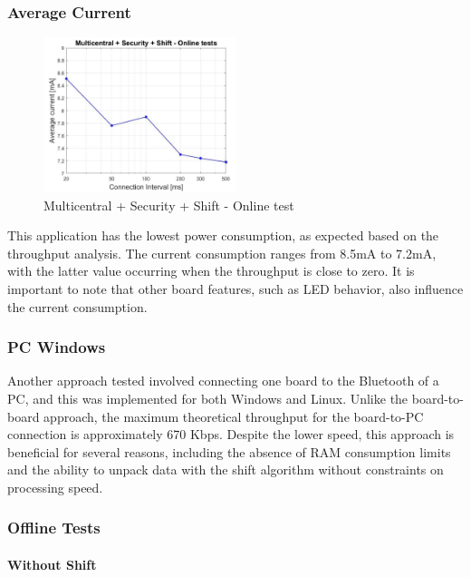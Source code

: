 \documentclass{Configuration_Files/PoliMi3i_thesis}
\begin{document}
\subsubsection*{Average Current}

\begin{figure}[H]
    \centering
    \includegraphics[width=0.5\textwidth]{Results Manuel/figure32}
    \caption{Multicentral + Security + Shift - Online test}
    \label{manuel_results_32}
\end{figure}

This application has the lowest power consumption, as expected based on the throughput analysis. The current consumption ranges from 8.5mA to 7.2mA, with the latter value occurring when the throughput is close to zero. It is important to note that other board features, such as LED behavior, also influence the current consumption.

\subsubsection*{PC Windows}

Another approach tested involved connecting one board to the Bluetooth of a PC, and this was implemented for both Windows and Linux. Unlike the board-to-board approach, the maximum theoretical throughput for the board-to-PC connection is approximately 670 Kbps. Despite the lower speed, this approach is beneficial for several reasons, including the absence of RAM consumption limits and the ability to unpack data with the shift algorithm without constraints on processing speed.

\subsubsection*{Offline Tests}

\paragraph{Without Shift}
\end{document}
